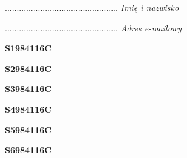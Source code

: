 \begin{turn}{90}\begin{minipage}{\linewidth} \vspace{20mm} ................................................  \textit{Imię i nazwisko}\end{minipage}\end{turn}

\begin{turn}{90}\begin{minipage}{\linewidth} \vspace{20mm} ................................................  \textit{Adres e-mailowy}\end{minipage}\end{turn}

\begin{turn}{90}\huge \begin{minipage}{\linewidth} \vspace{10mm}\textbf{S1984116C}\end{minipage}\end{turn}

\begin{turn}{90}\huge \begin{minipage}{\linewidth} \vspace{10mm}\textbf{S2984116C}\end{minipage}\end{turn}

\begin{turn}{90}\huge \begin{minipage}{\linewidth} \vspace{10mm}\textbf{S3984116C}\end{minipage}\end{turn}

\begin{turn}{90}\huge \begin{minipage}{\linewidth} \vspace{10mm}\textbf{S4984116C}\end{minipage}\end{turn}

\begin{turn}{90}\huge \begin{minipage}{\linewidth} \vspace{10mm}\textbf{S5984116C}\end{minipage}\end{turn}

\begin{turn}{90}\huge \begin{minipage}{\linewidth} \vspace{10mm}\textbf{S6984116C}\end{minipage}\end{turn}

